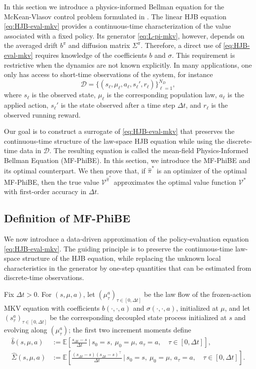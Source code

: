 \documentclass[a4paper, 10pt, english, reqno]{amsart}
\begin{document}
In this section we introduce a physics-informed Bellman equation for the
McKean-Vlasov control problem formulated in . The
linear HJB equation \eqref{eq:HJB-eval-mkv} provides a continuous-time
characterization of the value associated with a fixed policy. Its
generator \eqref{eq:L-pi-mkv}, however, depends on the averaged drift
$b^\pi$ and diffusion matrix $\Sigma^\pi$. Therefore, a direct use of
\eqref{eq:HJB-eval-mkv} requires knowledge of the coefficients $b$ and
$\sigma$. This requirement is restrictive when the dynamics are not known
explicitly. In many applications, one only has access to short-time
observations of the system, for instance
\[
\mathcal D
=
\bigl\{
(s_\ell,\mu_\ell,a_\ell,s_\ell',r_\ell)
\bigr\}_{\ell=1}^{N_D},
\]
where $s_\ell$ is the observed state, $\mu_\ell$ is the corresponding
population law, $a_\ell$ is the applied action, $s_\ell'$ is the state
observed after a time step $\Delta t$, and $r_\ell$ is the observed
running reward.

Our goal is to construct a surrogate of \eqref{eq:HJB-eval-mkv}
that preserves the continuous-time structure of the law-space HJB
equation while using the discrete-time data in $\mathcal D$. The resulting equation is called the mean-field Physics-Informed Bellman Equation (MF-PhiBE). In this section, we introduce the MF-PhiBE and its optimal counterpart.
We then prove that, if $\hat\pi^*$ is an optimizer of the optimal
MF-PhiBE, then the true value $\mathcal V^{\hat\pi^*}$ approximates the
optimal value function $\mathcal V^*$ with first-order accuracy in
$\Delta t$.


\subsection{Definition of MF-PhiBE}
\label{subsec:def-phibe}

We now introduce a data-driven approximation of the policy-evaluation
equation \eqref{eq:HJB-eval-mkv}. The guiding principle is to preserve
the continuous-time law-space structure of the HJB equation, while replacing
the unknown local characteristics in the generator by one-step quantities
that can be estimated from discrete-time observations.

Fix $\Delta t>0$. For $(s,\mu,a)$, let
$(\mu_\tau^a)_{\tau\in[0,\Delta t]}$ be the law flow of the frozen-action
MKV equation with coefficients $b(\cdot,\cdot,a)$ and
$\sigma(\cdot,\cdot,a)$, initialized at $\mu$, and let
$(s_\tau^a)_{\tau\in[0,\Delta t]}$ be the corresponding decoupled state
process initialized at $s$ and evolving along $(\mu_\tau^a)$; the first
two increment moments define
\begin{align}
\hat b(s,\mu,a)
&:=
\mathbb E\!\left[
\frac{s_{\Delta t}-s}{\Delta t}
\,\Big|\,
s_0=s,\ \mu_0=\mu,\, a_\tau=a,\quad\tau\in[0,\Delta t]
\right],
\label{eq:estimated-drift-policy-mkv22}
\\[4pt]
\hat \Sigma(s,\mu,a)
&:=
\mathbb E\!\left[
\frac{(s_{\Delta t}-s)(s_{\Delta t}-s)^\top}{\Delta t}
\,\Big|\,
s_0=s,\ \mu_0=\mu,\, a_\tau=a,\quad\tau\in[0,\Delta t]
\right].
\label{eq:estimated-covariance-policy-mkv2}
\end{align}
\end{document}
